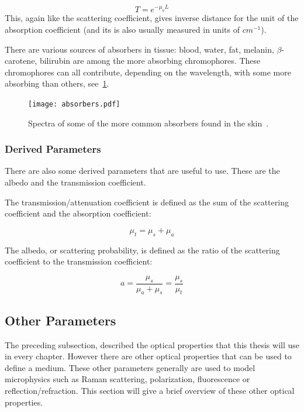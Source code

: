 \begin{equation}
	T=e^{-\mu_aL}
\end{equation}
This, again like the scattering coefficient, gives inverse distance for the unit of the absorption coefficient (and its is also usually measured in units of $cm^{-1}$).

There are various sources of absorbers in tissue: blood, water, fat, melanin, $\beta$-carotene, bilirubin are among the more absorbing chromophores. These chromophores can all contribute, depending on the wavelength, with some more absorbing than others, see~\cref{fig:absorb}. 

\begin{figure}
	\centering
	\texttt{[image: absorbers.pdf]}
	\caption{Spectra of some of the more common absorbers found in the skin~\cite{dixon2005photochemcad,photoprahl2017,segelstein1981complex,pope1997absorption,jacques2013optical,van2004determination,saidi1992transcutaneous,iglesias2015biophysically,bashkatov2011optical,sarna2006physical}.}
	\label{fig:absorb}
\end{figure}


\subsubsection{Derived Parameters}

There are also some derived parameters that are useful to use.
These are the albedo and the transmission coefficient.

The transmission/attenuation coefficient is defined as the sum of the scattering coefficient and the absorption coefficient:

\begin{equation}
\mu_t=\mu_s+\mu_a
\end{equation}

The albedo, or scattering probability, is defined as the ratio of the scattering coefficient to the transmission coefficient:

\begin{equation}
a = \frac{\mu_s}{\mu_a+\mu_s}=\frac{\mu_s}{\mu_t}
\end{equation}


\subsection*{Other Parameters}\label{sec:other}
The preceding subsection, described the optical properties that this thesis will use in every chapter. However there are other optical properties that can be used to define a medium. These other parameters generally are used to model microphysics such as Raman scattering, polarization, fluorescence or reflection/refraction. This section will give a brief overview of these other optical properties.



